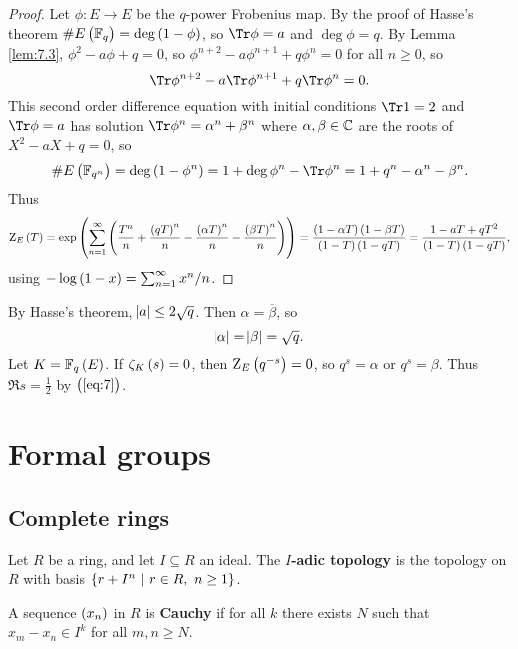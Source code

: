 \begin{proof}
Let $ \phi : E \to E $ be the $ q $-power Frobenius map. By the proof of Hasse's theorem $ \#E\br{\FF_q} = \deg \br{1 - \phi} $, so $ \Tr \phi = a $ and $ \deg \phi = q $. By Lemma \ref{lem:7.3}, $ \phi^2 - a\phi + q = 0 $, so $ \phi^{n + 2} - a\phi^{n + 1} + q\phi^n = 0 $ for all $ n \ge 0 $, so
$$ \Tr \phi^{n + 2} - a\Tr \phi^{n + 1} + q\Tr \phi^n = 0. $$
This second order difference equation with initial conditions $ \Tr 1 = 2 $ and $ \Tr \phi = a $ has solution $ \Tr \phi^n = \alpha^n + \beta^n $ where $ \alpha, \beta \in \mathbb{C} $ are the roots of $ X^2 - aX + q = 0 $, so
$$ \#E\br{\FF_{q^n}} = \deg \br{1 - \phi^n} = 1 + \deg \phi^n - \Tr \phi^n = 1 + q^n - \alpha^n - \beta^n. $$
Thus
$$ \Z_E\br{T} = \exp \br{\sum_{n = 1}^\infty \br{\dfrac{T^n}{n} + \dfrac{\br{qT}^n}{n} - \dfrac{\br{\alpha T}^n}{n} - \dfrac{\br{\beta T}^n}{n}}} = \dfrac{\br{1 - \alpha T}\br{1 - \beta T}}{\br{1 - T}\br{1 - qT}} = \dfrac{1 - aT + qT^2}{\br{1 - T}\br{1 - qT}}, $$
using $ -\log \br{1 - x} = \sum_{n = 1}^\infty x^n / n $.
\end{proof}

\begin{remark*}
By Hasse's theorem, $ \abs{a} \le 2\sqrt{q} $. Then $ \alpha = \overline{\beta} $, so
\begin{equation}
\label{eq:7}
\abs{\alpha} = \abs{\beta} = \sqrt{q}.
\end{equation}
Let $ K = \FF_q\br{E} $. If $ \zeta_K\br{s} = 0 $, then $ \Z_E\br{q^{-s}} = 0 $, so $ q^s = \alpha $ or $ q^s = \beta $. Thus $ \Re s = \tfrac{1}{2} $ by $ \br{\ref{eq:7}} $.
\end{remark*}

\pagebreak

\section{Formal groups}

\subsection{Complete rings}

\begin{definition*}
Let $ R $ be a ring, and let $ I \subseteq R $ an ideal. The \textbf{$ I $-adic topology} is the topology on $ R $ with basis $ \cbr{r + I^n \st r \in R, \ n \ge 1} $.
\end{definition*}

\begin{definition*}
A sequence $ \br{x_n} $ in $ R $ is \textbf{Cauchy} if for all $ k $ there exists $ N $ such that $ x_m - x_n \in I^k $ for all $ m, n \ge N $.
\end{definition*}

